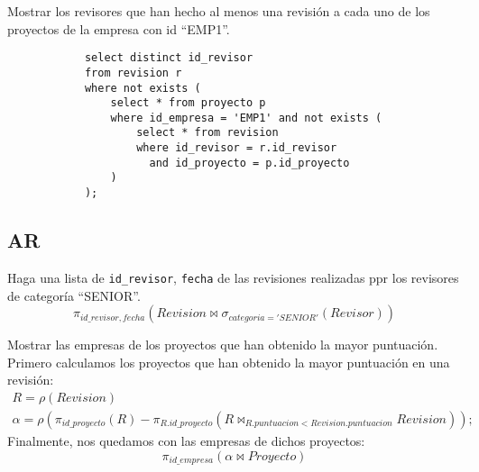 \documentclass[12pt]{article}
\begin{document}
    \begin{ejercicio}
        Mostrar los revisores que han hecho al menos una revisión a cada uno de los proyectos de la empresa con id ``EMP1''. 
        \begin{verbatim}
            select distinct id_revisor
            from revision r
            where not exists (
                select * from proyecto p
                where id_empresa = 'EMP1' and not exists (
                    select * from revision 
                    where id_revisor = r.id_revisor
                      and id_proyecto = p.id_proyecto
                )
            );
        \end{verbatim}    
    \end{ejercicio}
    \subsection*{AR}
    \begin{ejercicio}
        Haga una lista de \verb|id_revisor|, \verb|fecha| de las revisiones realizadas ppr los revisores de categoría ``SENIOR''.
        \begin{equation*}
            \pi_{id\_revisor, fecha}(Revision \bowtie \sigma_{categoria='SENIOR'}(Revisor))
        \end{equation*}
    \end{ejercicio}
    \begin{ejercicio}
        Mostrar las empresas de los proyectos que han obtenido la mayor puntuación.\\

        Primero calculamos los proyectos que han obtenido la mayor puntuación en una revisión:
        \begin{gather*}
            R = \rho(Revision) \\
            \alpha = \rho(\pi_{id\_proyecto}(R) - \pi_{R.id\_proyecto}(R\bowtie_{R.puntuacion<Revision.puntuacion} Revision));
        \end{gather*}   
        Finalmente, nos quedamos con las empresas de dichos proyectos:
        \begin{equation*}
            \pi_{id\_empresa}(\alpha \bowtie Proyecto)
        \end{equation*}
    \end{ejercicio}
\end{document}
